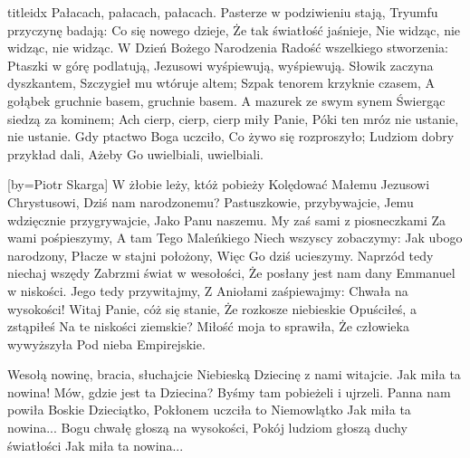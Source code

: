 \documentclass[a5paper, portrait, 12pt]{mwart}
\begin{document}
\begin{songs}{titleidx}
    Pałacach, pałacach, pałacach.
\endchorus
\beginverse
    Pasterze w podziwieniu stają,
    Tryumfu przyczynę badają:
\endverse
\beginchorus
    Co się nowego dzieje,
    Że tak światłość jaśnieje,
    Nie widząc, nie widząc, nie widząc.
\endchorus
\endsong
\beginverse
    W Dzień Bożego Narodzenia
    Radość wszelkiego stworzenia:
    Ptaszki w górę podlatują,
    Jezusowi wyśpiewują, wyśpiewują.
\endverse
\beginverse
    Słowik zaczyna dyszkantem,
    Szczygieł mu wtóruje altem;
    Szpak tenorem krzyknie czasem,
    A gołąbek gruchnie basem, gruchnie basem.
\endverse
\beginverse
    A mazurek ze swym synem
    Świergąc siedzą za kominem;
    Ach cierp, cierp, cierp miły Panie,
    Póki ten mróz nie ustanie, nie ustanie.
\endverse
\beginverse
    Gdy ptactwo Boga uczciło,
    Co żywo się rozproszyło;
    Ludziom dobry przykład dali,
    Ażeby Go uwielbiali, uwielbiali.
\endverse
\endsong

[by={Piotr Skarga}]
\beginverse
    W żłobie leży, któż pobieży
    Kolędować Małemu
    Jezusowi Chrystusowi,
    Dziś nam narodzonemu?
\endverse
\beginchorus
        Pastuszkowie, przybywajcie,
        Jemu wdzięcznie przygrywajcie,
        Jako Panu naszemu.
\endchorus
\beginverse
    My zaś sami z piosneczkami
    Za wami pośpieszymy,
    A tam Tego Maleńkiego
    Niech wszyscy zobaczymy:
\endverse
\beginchorus
        Jak ubogo narodzony,
        Płacze w stajni położony,
        Więc Go dziś ucieszymy.
\endchorus
\beginverse
    Naprzód tedy niechaj wszędy
    Zabrzmi świat w wesołości,
    Że posłany jest nam dany
    Emmanuel w niskości.
\endverse
\beginchorus
        Jego tedy przywitajmy,
        Z Aniołami zaśpiewajmy:
        Chwała na wysokości!
\endchorus
\beginverse
    Witaj Panie, cóż się stanie,
    Że rozkosze niebieskie
    Opuściłeś, a zstąpiłeś
    Na te niskości ziemskie?
\endverse
\beginchorus
        Miłość moja to sprawiła,
        Że człowieka wywyższyła
        Pod nieba Empirejskie.
\endchorus
\endsong

\beginverse
    Wesołą nowinę, bracia, słuchajcie
    Niebieską Dziecinę z nami witajcie.
\endverse
\beginchorus
        Jak miła ta nowina!
        Mów, gdzie jest ta Dziecina?
        Byśmy tam pobieżeli i ujrzeli.
\endchorus
\beginverse
    Panna nam powiła Boskie Dzieciątko,
    Pokłonem uczciła to Niemowlątko
\endverse
\beginchorus
        Jak miła ta nowina...
\endchorus
\beginverse
    Bogu chwałę głoszą na wysokości,
    Pokój ludziom głoszą duchy światłości
\endverse
\beginchorus
        Jak miła ta nowina...
\endchorus


\end{songs}
\end{document}
